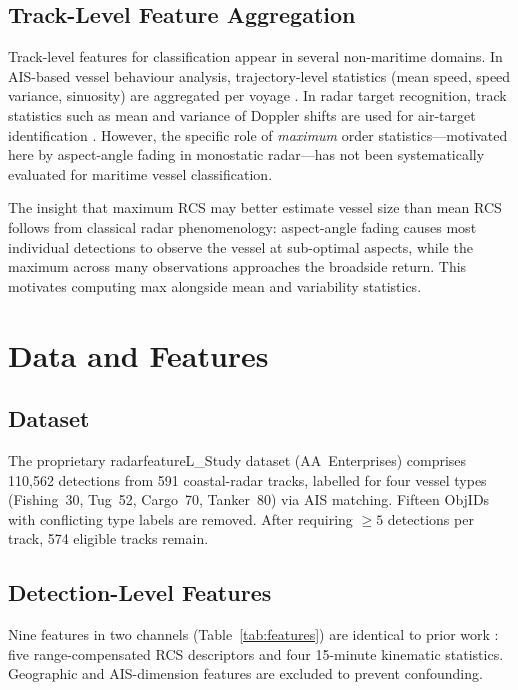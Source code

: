 \documentclass[10pt,journal,compsoc]{IEEEtran}
\begin{document}
\subsection{Track-Level Feature Aggregation}

Track-level features for classification appear in several non-maritime domains.
In AIS-based vessel behaviour analysis, trajectory-level statistics
(mean speed, speed variance, sinuosity) are aggregated per voyage
\cite{nielsen_2025}.  In radar target recognition, track statistics such as
mean and variance of Doppler shifts are used for air-target identification
\cite{garcia_fusion_2016}.  However, the specific role of \emph{maximum}
order statistics---motivated here by aspect-angle fading in monostatic
radar---has not been systematically evaluated for maritime vessel classification.

The insight that maximum RCS may better estimate vessel size than mean RCS
follows from classical radar phenomenology: aspect-angle fading causes most
individual detections to observe the vessel at sub-optimal aspects, while
the maximum across many observations approaches the broadside return.
This motivates computing max alongside mean and variability statistics.

\section{Data and Features}\label{sec:data}

\subsection{Dataset}

The proprietary radarfeatureL\_Study dataset (AA~Enterprises) comprises
110,562 detections from 591 coastal-radar tracks, labelled for four vessel
types (Fishing~30, Tug~52, Cargo~70, Tanker~80) via AIS matching.
Fifteen ObjIDs with conflicting type labels are removed.  After requiring
$\geq 5$ detections per track, 574 eligible tracks remain.

\subsection{Detection-Level Features}

Nine features in two channels (Table~\ref{tab:features}) are identical to
prior work \cite{paper6_kinrcs,paper7_arith}: five range-compensated RCS
descriptors and four 15-minute kinematic statistics.  Geographic and
AIS-dimension features are excluded to prevent confounding.
\end{document}
